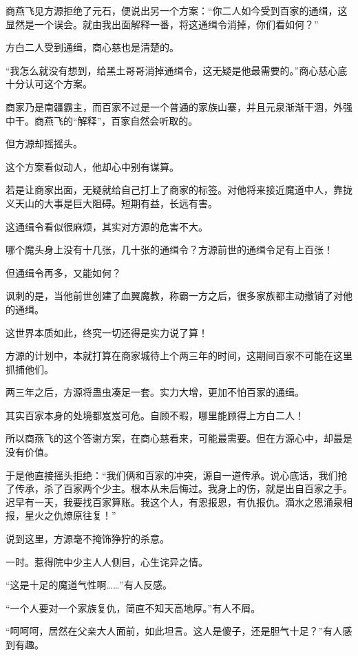 
\begin{this_body}

商燕飞见方源拒绝了元石，便说出另一个方案：“你二人如今受到百家的通缉，这显然是一个误会。就由我出面解释一番，将这通缉令消掉，你们看如何？”

方白二人受到通缉，商心慈也是清楚的。

“我怎么就没有想到，给黑土哥哥消掉通缉令，这无疑是他最需要的。”商心慈心底十分认可这个方案。

商家乃是南疆霸主，而百家不过是一个普通的家族山寨，并且元泉渐渐干涸，外强中干。商燕飞的“解释”，百家自然会听取的。

但方源却摇摇头。

这个方案看似动人，他却心中别有谋算。

若是让商家出面，无疑就给自己打上了商家的标签。对他将来接近魔道中人，靠拢义天山的大事是巨大阻碍。短期有益，长远有害。

这通缉令看似很麻烦，其实对方源的危害不大。

哪个魔头身上没有十几张，几十张的通缉令？方源前世的通缉令足有上百张！

但通缉令再多，又能如何？

讽刺的是，当他前世创建了血翼魔教，称霸一方之后，很多家族都主动撤销了对他的通缉。

这世界本质如此，终究一切还得是实力说了算！

方源的计划中，本就打算在商家城待上个两三年的时间，这期间百家不可能在这里抓捕他们。

两三年之后，方源将蛊虫凑足一套。实力大增，更加不怕百家的通缉。

其实百家本身的处境都岌岌可危。自顾不暇，哪里能顾得上方白二人！

所以商燕飞的这个答谢方案，在商心慈看来，可能最需要。但在方源心中，却最是没有价值。

于是他直接摇头拒绝：“我们俩和百家的冲突，源自一道传承。说心底话，我们抢了传承，杀了百家两个少主。根本从未后悔过。我身上的伤，就是出自百家之手。迟早有一天，我要找百家算账。我这个人，有恩报恩，有仇报仇。滴水之恩涌泉相报，星火之仇燎原往复！”

说到这里，方源毫不掩饰狰狞的杀意。

一时。惹得院中少主人人侧目，心生诧异之情。

“这是十足的魔道气性啊……”有人反感。

“一个人要对一个家族复仇，简直不知天高地厚。”有人不屑。

“呵呵呵，居然在父亲大人面前，如此坦言。这人是傻子，还是胆气十足？”有人感到有趣。


\end{this_body}
